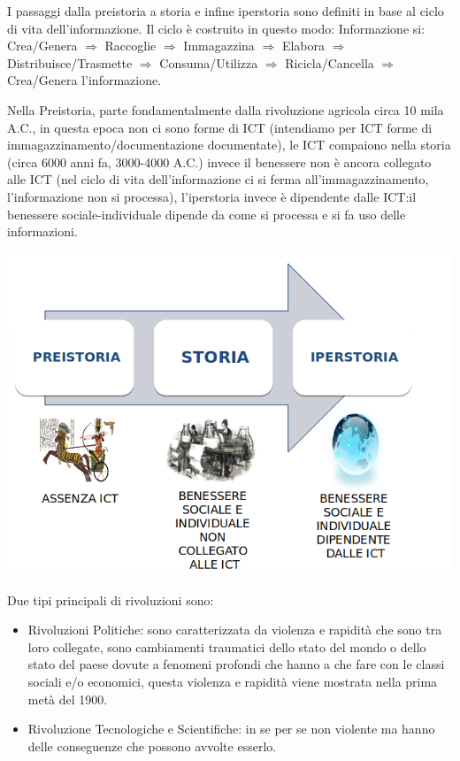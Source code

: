 \documentclass[a4page, 11pt]{article}
\begin{document}
I passaggi dalla preistoria a storia e infine iperstoria sono definiti
in base al ciclo di vita dell'informazione. Il ciclo è costruito in
questo modo: Informazione si: Crea/Genera $\Rightarrow$ Raccoglie $\Rightarrow$ Immagazzina $\Rightarrow$
Elabora $\Rightarrow$ Distribuisce/Trasmette $\Rightarrow$ Consuma/Utilizza $\Rightarrow$ Ricicla/Cancella $\Rightarrow$
Crea/Genera l'informazione.

Nella Preistoria, parte fondamentalmente dalla rivoluzione agricola
circa 10 mila A.C., in questa epoca non ci sono forme di ICT (intendiamo
per ICT forme di immagazzinamento/documentazione documentate), le ICT
compaiono nella storia (circa 6000 anni fa, 3000-4000 A.C.) invece il
benessere non è ancora collegato alle ICT (nel ciclo di vita
dell'informazione ci si ferma all'immagazzinamento, l'informazione non
si processa), l'iperstoria invece è dipendente dalle ICT:il 
benessere sociale-individuale dipende da come si
processa e si fa uso delle informazioni.\newline
\begin{center}
	\includegraphics[scale=0.6]{image1.png}
\end{center}
Due tipi principali di rivoluzioni sono:

\begin{itemize}
	 
	\item
	Rivoluzioni Politiche: sono caratterizzata da violenza e rapidità che
	sono tra loro collegate, sono cambiamenti traumatici dello stato del
	mondo o dello stato del paese dovute a fenomeni profondi che hanno a
	che fare con le classi sociali e/o economici, questa violenza e
	rapidità viene mostrata nella prima metà del 1900.
	\item
	Rivoluzione Tecnologiche e Scientifiche: in se per se non violente ma
	hanno delle conseguenze che possono avvolte esserlo.
\end{itemize}
\end{document}
